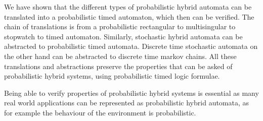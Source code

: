 We have shown that the different types of probabilistic hybrid automata can be translated into a probabilistic timed automaton, which then can be verified. The chain of translations is from a probabilistic rectangular to multisingular to stopwatch to timed automaton. Similarly, stochastic hybrid automata can be abstracted to probabilistic timed automata. Discrete time stochastic automata on the other hand can be abstracted to discrete time markov chains. All these translations and abstractions preserve the properties that can be asked of probabilistic hybrid systems, using probabilistic timed logic formulae.

Being able to verify properties of probabilistic hybrid systems is essential as many real world applications can be represented as probabilistic hybrid automata, as for example the behaviour of the environment is probabilistic.
